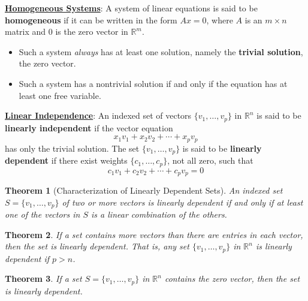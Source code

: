 \documentclass{article}
\newtheorem{theorem}{Theorem}
\newcommand{\definition}[1]{\underline{\textbf{#1}}}
\begin{document}
\definition{Homogeneous Systems}: A system of linear equations is said to be \textbf{homogeneous} if it can be written in the form $Ax = 0$, where $A$ is an $m \times n$ matrix and $0$ is the zero vector in $\mathbb{R}^m$.
\begin{itemize}
  \item Such a system \textit{always} has at least one solution, namely the \textbf{trivial solution}, the zero vector.
  \item Such a system has a nontrivial solution if and only if the equation has at least one free variable.
\end{itemize}

\vspace{5mm}

\definition{Linear Independence}: An indexed set of vectors $\{v_1, \ldots, v_p\}$ in $\mathbb{R}^n$ is said to be \textbf{linearly independent} if the vector equation
\begin{equation*}
  x_1v_1 + x_2v_2 + \cdots + x_pv_p
\end{equation*}
has only the trivial solution. The set $\{v_1, \ldots, v_p\}$ is said to be \textbf{linearly dependent} if there exist weights $\{c_1, \ldots, c_p\}$, not all zero, such that
\begin{equation*}
  c_1v_1 + c_2v_2 + \cdots + c_pv_p = 0
\end{equation*}

\vspace{5mm}

\begin{theorem}[Characterization of Linearly Dependent Sets]
  An indexed set $S = \{v_1, \ldots, v_p\}$ of two or more vectors is linearly dependent if and only if at least one of the vectors in $S$ is a linear combination of the others.
\end{theorem}

\vspace{5mm}

\begin{theorem}
  If a set contains more vectors than there are entries in each vector, then the set is linearly dependent. That is, any set $\{v_1, \ldots, v_p\}$ in $\mathbb{R}^n$ is linearly dependent if $p > n$.
\end{theorem}

\vspace{5mm}

\begin{theorem}
  If a set $S = \{v_1, \ldots, v_p\}$ in $\mathbb{R}^n$ contains the zero vector, then the set is linearly dependent.
\end{theorem}
\end{document}
